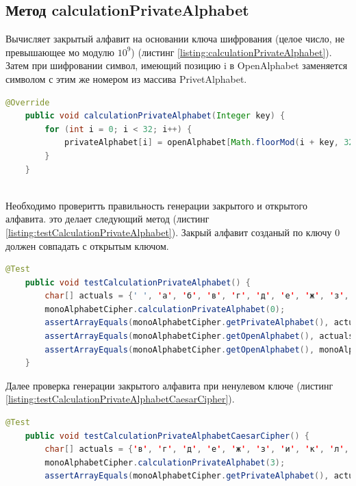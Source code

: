 \documentclass[a4paper,12pt]{article}
\begin{document}
\subsection{Метод calculationPrivateAlphabet}
Вычисляет закрытый алфавит на основании ключа шифрования (целое число, не превышающее мо модулю $10^9$) (листинг \ref{listing:calculationPrivateAlphabet}). Затем при шифровании символ, имеющий позицию i в OpenAlphabet заменяется символом с этим же номером из массива PrivetAlphabet.
\begin{lstlisting}[language=java, caption=метод calculationPrivateAlphabet, label = listing:calculationPrivateAlphabet]
	@Override
    public void calculationPrivateAlphabet(Integer key) {
        for (int i = 0; i < 32; i++) {
            privateAlphabet[i] = openAlphabet[Math.floorMod(i + key, 32)];
        }
    }
    
\end{lstlisting}
Необходимо проверитть правильность генерации закрытого и открытого алфавита. это делает следующий метод (листинг \ref{listing:testCalculationPrivateAlphabet}). Закрый алфавит созданый по ключу 0 должен совпадать с открытым ключом.
\begin{lstlisting}[language=java, caption=метод теста testCalculationPrivateAlphabet, label = listing:testCalculationPrivateAlphabet]
@Test
    public void testCalculationPrivateAlphabet() {
        char[] actuals = {' ', 'а', 'б', 'в', 'г', 'д', 'е', 'ж', 'з', 'и', 'к', 'л', 'м', 'н', 'о', 'п', 'р', 'с', 'т', 'у', 'ф', 'х', 'ц', 'ч', 'ш', 'щ', 'ъ', 'ы', 'ь', 'э', 'ю', 'я'};
        monoAlphabetCipher.calculationPrivateAlphabet(0);
        assertArrayEquals(monoAlphabetCipher.getPrivateAlphabet(), actuals);
        assertArrayEquals(monoAlphabetCipher.getOpenAlphabet(), actuals);
        assertArrayEquals(monoAlphabetCipher.getOpenAlphabet(), monoAlphabetCipher.getOpenAlphabet());
    }
\end{lstlisting}
Далее проверка генерации закрытого алфавита при ненулевом ключе (листинг \ref{listing:testCalculationPrivateAlphabetCaesarCipher}).
\begin{lstlisting}[language=java, caption=метод теста testCalculationPrivateAlphabet, label = listing:testCalculationPrivateAlphabetCaesarCipher]
	@Test
    public void testCalculationPrivateAlphabetCaesarCipher() {
        char[] actuals = {'в', 'г', 'д', 'е', 'ж', 'з', 'и', 'к', 'л', 'м', 'н', 'о', 'п', 'р', 'с', 'т', 'у', 'ф', 'х', 'ц', 'ч', 'ш', 'щ', 'ъ', 'ы', 'ь', 'э', 'ю', 'я', ' ', 'а', 'б'};
        monoAlphabetCipher.calculationPrivateAlphabet(3);
        assertArrayEquals(monoAlphabetCipher.getPrivateAlphabet(), actuals);
\end{lstlisting}
\end{document}
